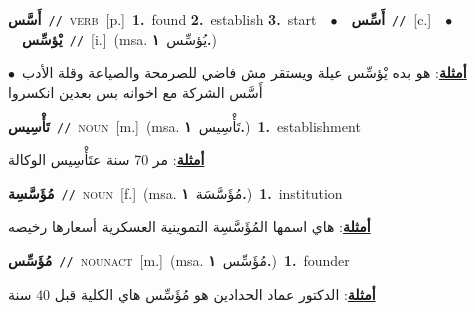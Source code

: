 \documentclass[10pt,a4paper,twoside]{article} %
\begin{document}
\begin{multicols}{2}
{\setlength\topsep{0pt}\textbf{\foreignlanguage{arabic}{أَسَّس}}\ {\color{gray}\texttt{//}\color{black}}\ \textsc{verb}\ [p.]\ \textbf{1.}~found  \textbf{2.}~establish  \textbf{3.}~start\ \ $\bullet$\ \ \setlength\topsep{0pt}\textbf{\foreignlanguage{arabic}{أَسِّس}}\ {\color{gray}\texttt{//}\color{black}}\ [c.]\ \ $\bullet$\ \ \setlength\topsep{0pt}\textbf{\foreignlanguage{arabic}{يْؤسِّس}}\ {\color{gray}\texttt{//}\color{black}}\ [i.]\ \color{gray}(msa. \foreignlanguage{arabic}{يُؤسِّس}~\foreignlanguage{arabic}{\textbf{١.}})\color{black}\  \begin{flushright}\color{gray}\foreignlanguage{arabic}{\textbf{\underline{\foreignlanguage{arabic}{أمثلة}}}: هو بده يْؤسِّس عيلة ويستقر مش فاضي للصرمحة والصياعة وقلة الأدب\ $\bullet$\ \  أَسَّس الشركة مع اخوانه بس بعدين انكسروا}\end{flushright}\color{black}} \vspace{2mm}

{\setlength\topsep{0pt}\textbf{\foreignlanguage{arabic}{تَأْسِيس}}\ {\color{gray}\texttt{//}\color{black}}\ \textsc{noun}\ [m.]\ \color{gray}(msa. \foreignlanguage{arabic}{تَأْسِيس}~\foreignlanguage{arabic}{\textbf{١.}})\color{black}\ \textbf{1.}~establishment\  \begin{flushright}\color{gray}\foreignlanguage{arabic}{\textbf{\underline{\foreignlanguage{arabic}{أمثلة}}}: مر 70 سنة عتَأْسِيس الوكالة}\end{flushright}\color{black}} \vspace{2mm}

{\setlength\topsep{0pt}\textbf{\foreignlanguage{arabic}{مُؤَسَّسِة}}\ {\color{gray}\texttt{//}\color{black}}\ \textsc{noun}\ [f.]\ \color{gray}(msa. \foreignlanguage{arabic}{مُؤَسَّسَة}~\foreignlanguage{arabic}{\textbf{١.}})\color{black}\ \textbf{1.}~institution\  \begin{flushright}\color{gray}\foreignlanguage{arabic}{\textbf{\underline{\foreignlanguage{arabic}{أمثلة}}}: هاي اسمها المُؤَسَّسِة التموينية العسكرية أسعارها رخيصه}\end{flushright}\color{black}} \vspace{2mm}

{\setlength\topsep{0pt}\textbf{\foreignlanguage{arabic}{مُؤَسِّس}}\ {\color{gray}\texttt{//}\color{black}}\ \textsc{noun\textunderscore act}\ [m.]\ \color{gray}(msa. \foreignlanguage{arabic}{مُؤَسِّس}~\foreignlanguage{arabic}{\textbf{١.}})\color{black}\ \textbf{1.}~founder\  \begin{flushright}\color{gray}\foreignlanguage{arabic}{\textbf{\underline{\foreignlanguage{arabic}{أمثلة}}}: الدكتور عماد الحدادين هو مُؤَسِّس هاي الكلية قبل 40 سنة}\end{flushright}\color{black}} \vspace{2mm}


\end{multicols}
\end{document}
